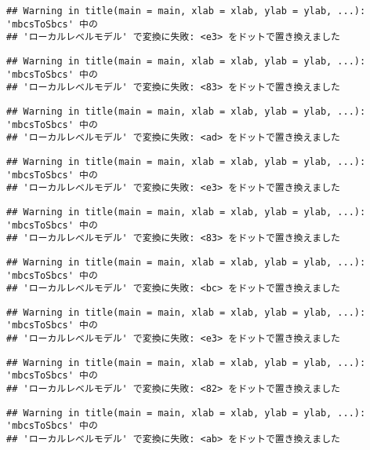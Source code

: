 \documentclass[]{article}
\begin{document}
\begin{verbatim}
## Warning in title(main = main, xlab = xlab, ylab = ylab, ...): 'mbcsToSbcs' 中の
## 'ローカルレベルモデル' で変換に失敗: <e3> をドットで置き換えました
\end{verbatim}

\begin{verbatim}
## Warning in title(main = main, xlab = xlab, ylab = ylab, ...): 'mbcsToSbcs' 中の
## 'ローカルレベルモデル' で変換に失敗: <83> をドットで置き換えました
\end{verbatim}

\begin{verbatim}
## Warning in title(main = main, xlab = xlab, ylab = ylab, ...): 'mbcsToSbcs' 中の
## 'ローカルレベルモデル' で変換に失敗: <ad> をドットで置き換えました
\end{verbatim}

\begin{verbatim}
## Warning in title(main = main, xlab = xlab, ylab = ylab, ...): 'mbcsToSbcs' 中の
## 'ローカルレベルモデル' で変換に失敗: <e3> をドットで置き換えました
\end{verbatim}

\begin{verbatim}
## Warning in title(main = main, xlab = xlab, ylab = ylab, ...): 'mbcsToSbcs' 中の
## 'ローカルレベルモデル' で変換に失敗: <83> をドットで置き換えました
\end{verbatim}

\begin{verbatim}
## Warning in title(main = main, xlab = xlab, ylab = ylab, ...): 'mbcsToSbcs' 中の
## 'ローカルレベルモデル' で変換に失敗: <bc> をドットで置き換えました
\end{verbatim}

\begin{verbatim}
## Warning in title(main = main, xlab = xlab, ylab = ylab, ...): 'mbcsToSbcs' 中の
## 'ローカルレベルモデル' で変換に失敗: <e3> をドットで置き換えました
\end{verbatim}

\begin{verbatim}
## Warning in title(main = main, xlab = xlab, ylab = ylab, ...): 'mbcsToSbcs' 中の
## 'ローカルレベルモデル' で変換に失敗: <82> をドットで置き換えました
\end{verbatim}

\begin{verbatim}
## Warning in title(main = main, xlab = xlab, ylab = ylab, ...): 'mbcsToSbcs' 中の
## 'ローカルレベルモデル' で変換に失敗: <ab> をドットで置き換えました
\end{verbatim}
\end{document}
